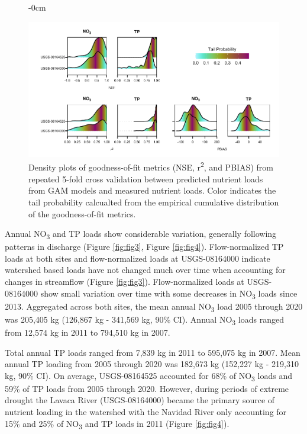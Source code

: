 \documentclass[water,article,submit,oneauthor]{Definitions/mdpi}
\begin{document}
\begin{figure}\begin{adjustwidth}{-\extralength}{0cm}

{\centering \includegraphics[width=1\linewidth]{Schramm-Manuscript-2023_files/figure-latex/fig2-1} 

}

\end{adjustwidth}\caption[Density plots of goodness-of-fit metrics (NSE, r\textsuperscript{2}, and PBIAS) from repeated 5-fold cross validation between predicted nutrient loads from GAM models and measured nutrient loads]{Density plots of goodness-of-fit metrics (NSE, r\textsuperscript{2}, and PBIAS) from repeated 5-fold cross validation between predicted nutrient loads from GAM models and measured nutrient loads. Color indicates the tail probability calcualted from the empirical cumulative distribution of the goodness-of-fit metrics.}\label{fig:fig2}
\end{figure}

Annual NO\textsubscript{3} and TP loads show considerable variation,
generally following patterns in discharge (Figure \ref{fig:fig3}, Figure
\ref{fig:fig4}). Flow-normalized TP loads at both sites and
flow-normalized loads at USGS-08164000 indicate watershed based loads
have not changed much over time when accounting for changes in
streamflow (Figure \ref{fig:fig3}). Flow-normalized loads at
USGS-08164000 show small variation over time with some decreases in
NO\textsubscript{3} loads since 2013. Aggregated across both sites, the
mean annual NO\textsubscript{3} load 2005 through 2020 was 205,405 kg
(126,867 kg - 341,569 kg, 90\% CI). Annual NO\textsubscript{3} loads
ranged from 12,574 kg in 2011 to 794,510 kg in 2007.

Total annual TP loads ranged from 7,839 kg in 2011 to 595,075 kg in
2007. Mean annual TP loading from 2005 through 2020 was 182,673 kg
(152,227 kg - 219,310 kg, 90\% CI). On average, USGS-08164525 accounted
for 68\% of NO\textsubscript{3} loads and 59\% of TP loads from 2005
through 2020. However, during periods of extreme drought the Lavaca
River (USGS-08164000) became the primary source of nutrient loading in
the watershed with the Navidad River only accounting for 15\% and 25\%
of NO\textsubscript{3} and TP loads in 2011 (Figure \ref{fig:fig4}).
\end{document}
